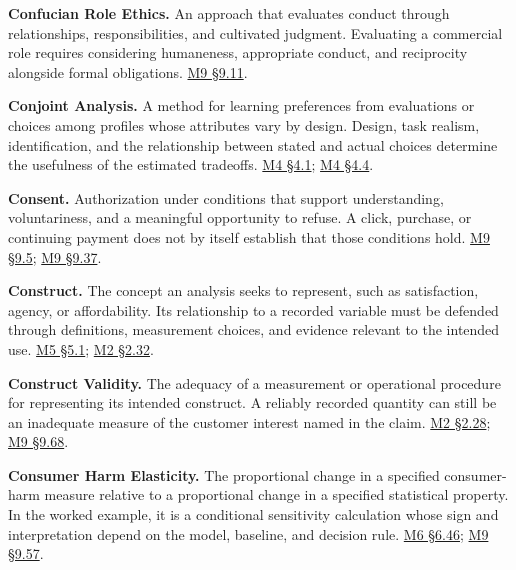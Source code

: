 \noindent\textbf{Confucian Role Ethics.} An approach that evaluates conduct
through relationships, responsibilities, and cultivated judgment.
Evaluating a commercial role requires considering humaneness,
appropriate conduct, and reciprocity alongside formal obligations.
\hyperref[M09-confucian-perspectives-on-marketing-conduct]{M9
§9.11}.

\noindent\textbf{Conjoint Analysis.} A method for learning preferences from
evaluations or choices among profiles whose attributes vary by design.
Design, task realism, identification, and the relationship between
stated and actual choices determine the usefulness of the estimated
tradeoffs.
\href{Marketing_Analytics_Lecture_Notes.pdf\#M04-product-design-requires-tradeoffs}{M4
§4.1};
\href{Marketing_Analytics_Lecture_Notes.pdf\#M04-estimate-and-validate-preferences}{M4
§4.4}.

\noindent\textbf{Consent.} Authorization under conditions that support
understanding, voluntariness, and a meaningful opportunity to refuse. A
click, purchase, or continuing payment does not by itself establish that
those conditions hold.
\hyperref[M09-worked-case-identical-renewal-different-customer-intent]{M9
§9.5};
\hyperref[M09-mobile-targeting-and-authority-over-customer-information]{M9
§9.37}.

\noindent\textbf{Construct.} The concept an analysis seeks to represent, such as
satisfaction, agency, or affordability. Its relationship to a recorded
variable must be defended through definitions, measurement choices, and
evidence relevant to the intended use.
\href{Marketing_Analytics_Lecture_Notes.pdf\#M05-define-the-construct-and-the-document}{M5
§5.1};
\href{Marketing_Analytics_Lecture_Notes.pdf\#M02-defining-harm-before-choosing-its-measure}{M2
§2.32}.

\noindent\textbf{Construct Validity.} The adequacy of a measurement or
operational procedure for representing its intended construct. A
reliably recorded quantity can still be an inadequate measure of the
customer interest named in the claim.
\href{Marketing_Analytics_Lecture_Notes.pdf\#M02-electricity-prices-household-bills-and-the-unit-of-harm}{M2
§2.28};
\hyperref[M09-worked-assessments-of-the-missing-object]{M9
§9.68}.

\noindent\textbf{Consumer Harm Elasticity.} The proportional change in a
specified consumer-harm measure relative to a proportional change in a
specified statistical property. In the worked example, it is a
conditional sensitivity calculation whose sign and interpretation depend
on the model, baseline, and decision rule.
\href{Marketing_Analytics_Lecture_Notes.pdf\#M06-greater-precision-and-fewer-detected-harms}{M6
§6.46};
\hyperref[M09-heterogeneity-and-the-interpretation-of-consumer-harm]{M9
§9.57}.

